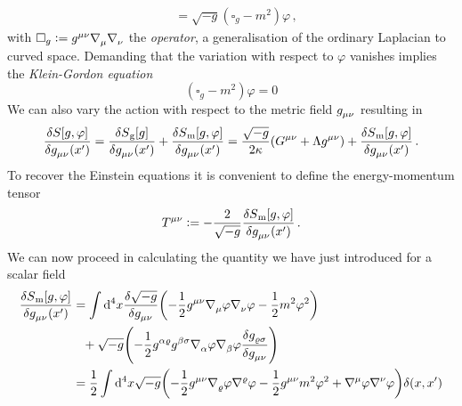 \begin{example}
\begin{equation}
\begin{split}
&=\sqrt{-g}\left(\square_{g}-m^2\right)\varphi\, ,
\end{split}
\end{equation}
with $\square_{g}:=\tensor{g}{^\mu^\nu}
\tensor{\nabla}{_\mu}\tensor{\nabla}{_\nu} $ the
\emph{ operator}, a generalisation of the ordinary
Laplacian to curved space.
Demanding that the variation with respect to $\varphi$ vanishes implies the
\emph{Klein-Gordon equation}
\begin{equation}
\left(\square_g-m^2\right)\varphi=0
\end{equation}
We can also vary the action with respect to the metric
field $\tensor{g}{_\mu_\nu}$ resulting in 
\begin{equation}
\frac{\delta S[g,\varphi]}{\delta
\tensor{g}{_\mu_\nu}\left(x'\right)}=
\frac{\delta S\textsubscript{g}[g]}{\delta
\tensor{g}{_\mu_\nu}\left(x'\right)}
+\frac{\delta S\textsubscript{m}[g,\varphi]}{\delta
\tensor{g}{_\mu_\nu}\left(x'\right)}
=\frac{\sqrt{-g}}{2\kappa}\left(\tensor{G}{^\mu^\nu}+\Lambda\tensor{g}{^\mu^\nu}
\right)+\frac{\delta S\textsubscript{m}[g,\varphi]}{\delta
\tensor{g}{_\mu_\nu}\left(x'\right)}\,.
\end{equation}
To recover the Einstein equations it is convenient to define the
energy-momentum tensor 
\begin{equation}
\tensor{T}{^\mu^\nu}:=-\frac{2}{\sqrt{-g}}\frac{\delta
S\textsubscript{m}[g,\varphi]}{\delta \tensor{g}{_\mu_\nu}\left(x'\right)}\,.
\end{equation}
We can now proceed in calculating the quantity we have just introduced for a
scalar field
\begin{equation}
\begin{split}
\frac{\delta
S\textsubscript{m}[g,\varphi]}{\delta \tensor{g}{_\mu_\nu}\left(x'\right)}
&=\int \dif{}^4x \frac{\delta\sqrt{-g}}{\delta
\tensor{g}{_\mu_\nu}}\left(-\frac{1}{2}\tensor{g}{^\mu^\nu}
\tensor{\nabla}{_\mu}\varphi\tensor{\nabla}{_\nu}\varphi-\frac{1}{2}m^2\varphi^2\right)\\
&\phantom{=}+
\sqrt{-g}\left(-\frac{1}{2}\tensor{g}{^\alpha^\varrho}\tensor{g}{^\beta^\sigma} \tensor{\nabla}{_\alpha}\varphi\tensor{\nabla}{_\beta}\varphi\frac{\delta
\tensor{g}{_\varrho_\sigma}}{\delta \tensor{g}{_\mu_\nu}}\right)\\
&=\frac{1}{2}\int \dif{}^4 x
\sqrt{-g}\left(-\frac{1}{2}\tensor{g}{^\mu^\nu}\tensor{\nabla}{_\varrho}\varphi\tensor{\nabla}{^\varrho}\varphi-\frac{1}{2}\tensor{g}{^\mu^\nu}m^2\varphi^2
+\tensor{\nabla}{^\mu}\varphi\tensor{\nabla}{^\nu}\varphi\right)\delta(x,x')\\

\end{split}
\end{equation}
\end{example}
